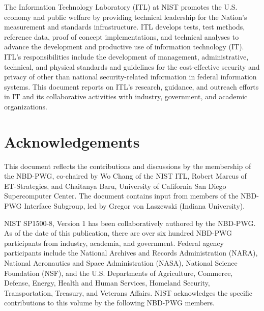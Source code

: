The Information Technology Laboratory (ITL) at NIST promotes the
U.S. economy and public welfare by providing technical leadership for
the Nation’s measurement and standards infrastructure. ITL develops
tests, test methods, reference data, proof of concept implementations,
and technical analyses to advance the development and productive use
of information technology (IT). ITL’s responsibilities include the
development of management, administrative, technical, and physical
standards and guidelines for the cost-effective security and privacy
of other than national security-related information in federal
information systems. This document reports on ITL’s research,
guidance, and outreach efforts in IT and its collaborative activities
with industry, government, and academic organizations.


\section*{\hfill Acknowledgements \hfill}

This document reflects the contributions and discussions by the
membership of the NBD-PWG, co-chaired by Wo Chang of the NIST ITL,
Robert Marcus of ET-Strategies, and Chaitanya Baru, University of
California San Diego Supercomputer Center.  The document contains
input from members of the NBD-PWG Interface Subgroup, led by Gregor
von Laszewski (Indiana University).

NIST SP1500-8, Version 1 has been collaboratively authored by the
NBD-PWG.  As of the date of this publication, there are over six
hundred NBD-PWG participants from industry, academia, and government.
Federal agency participants include the National Archives and Records
Administration (NARA), National Aeronautics and Space Administration
(NASA), National Science Foundation (NSF), and the U.S.  Departments
of Agriculture, Commerce, Defense, Energy, Health and Human Services,
Homeland Security, Transportation, Treasury, and Veterans
Affairs. NIST acknowledges the specific contributions to this volume
by the following NBD-PWG members.


